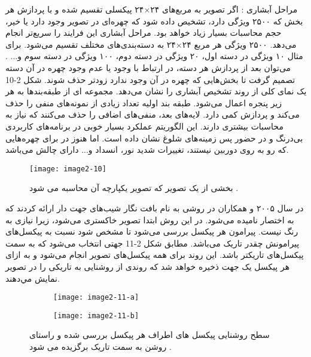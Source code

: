 \noindent
مراحل آبشاری : اگر تصویر به مربع‌های ۲۴×۲۴ پیکسلی تقسیم شده و با پردازش هر بخش که ۲۵۰۰ ویژگی دارد، تشخیص داده شود که چهره‌ای در تصویر وجود دارد یا خیر، حجم محاسبات بسیار زیاد خواهد بود. مراحل آبشاری این فرایند را سریع‌تر انجام می‌دهد. ۲۵۰۰ ویژگی هر مربع ۲۴×۲۴ به دسته‌بندی‌های مختلف تقسیم می‌شود. برای مثال ۱۰ ویژگی در دسته‌ اول، ۲۰ ویژگی در دسته دوم، ۱۰۰ ویژگی در دسته سوم و... . می‌توان بعد از پردازش هر دسته، در ارتباط با وجود یا عدم وجود چهره در آن دسته تصمیم گرفت تا بخش‌هایی که چهره در آن وجود ندارد زودتر حذف شوند. شکل 2-10 یک نمای کلی از روند تشخیص آبشاری را نشان می‌دهد. مجموعه ای از طبقه‌بندها به هر زیر پنجره اعمال می‌شود. طبقه بند اولیه تعداد زیادی از نمونه‌های منفی را حذف می‌کند و پردازش کمی دارد. لایه‌های بعد، منفی‌های اضافی را حذف می‌کنند که نیاز به محاسبات بیشتری دارند. این الگوریتم عملکرد بسیار خوبی در برنامه‌های کاربردی بی‌درنگ و در حضور پس زمینه‌های شلوغ نشان داده است. اما هنوز در برای چهره‌هایی که رو به روی دوربین نیستند، تغییرات شدید نور، انسداد و... دارای چالش می‌باشد.

\begin{figure}[h]
\centering
  \texttt{[image: image2-10]}
  \caption{بخشی از یک تصویر که تصویر یکپارچه آن محاسبه می شود \cite{ref1}.}
  \label{image2-10}
\end{figure}

\noindent
در سال ۲۰۰۵  و همکاران در \cite{1467360} روشی به نام بافت نگار شیب‌های جهت دار ارائه کردند که به اختصار  نامیده می‌شود. در این روش ابتدا تصویر خاکستری می‌شود، زیرا نیازی به رنگ نیست. پیرامون هر پیکسل بررسی می‌شود تا مشخص شود نسبت به پیکسل‌های پیرامونش چقدر تاریک می‌باشد. مطابق شکل 2-11 جهتی انتخاب می‌شود که به سمت پیکسل‌های تاریکتر باشد. این روند برای همه پیکسل‌های تصوير انجام می‌شود و به ازای هر پیکسل یک جهت ذخیره خواهد شد که روندی از روشنايى به تاريكى را در تصوير نمايش مي‌دهند.

\begin{figure}
\begin{subfigure}{.5\textwidth}
  \centering
  \texttt{[image: image2-11-a]}
  \label{image2-11-a}
\end{subfigure}
\begin{subfigure}{.5\textwidth}
  \centering
  \texttt{[image: image2-11-b]}
  \label{image2-11-b}
\end{subfigure}
 \caption{سطح روشنایی پیکسل های اطراف هر پیکسل بررسی شده و راستای روشن به سمت تاریک برگزیده می شود \cite{ref1}.}
\label{fig:image2-11}
\end{figure}

